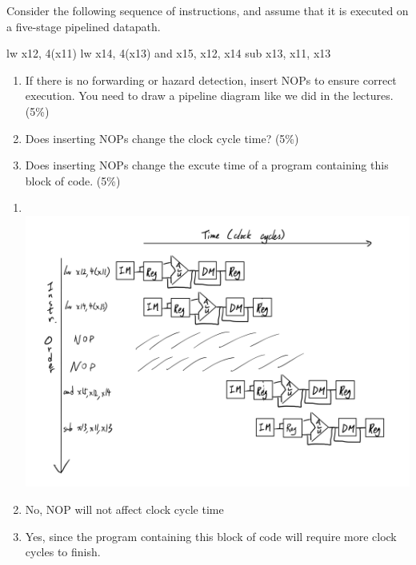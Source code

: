 \documentclass[12pt, a4paper]{article}
\begin{document}
\begin{q}{15}
    Consider the following sequence of instructions, and assume that it is executed on a
five-stage pipelined datapath.
\begin{code}
    lw x12, 4(x11)
    lw x14, 4(x13)
    and x15, x12, x14
    sub x13, x11, x13
\end{code}
\begin{enumerate}
    \item If there is no forwarding or hazard detection, insert NOPs to ensure correct execution.
    You need to draw a pipeline diagram like we did in the lectures. (5\%)
    \item Does inserting NOPs change the clock cycle time? (5\%)
    \item Does inserting NOPs change the excute time of a program containing this block of
    code. (5\%)
\end{enumerate}
\end{q}
\begin{ans}
    \begin{enumerate}
        \item \text{ }\\\includegraphics[width=1\linewidth]{../figs/q2.1-1.jpg}
        \item No, NOP will not affect clock cycle time
        \item Yes, since the program containing this block of code will require more clock cycles to finish. 
    \end{enumerate}
\end{ans}
\pagebreak
\end{document}
